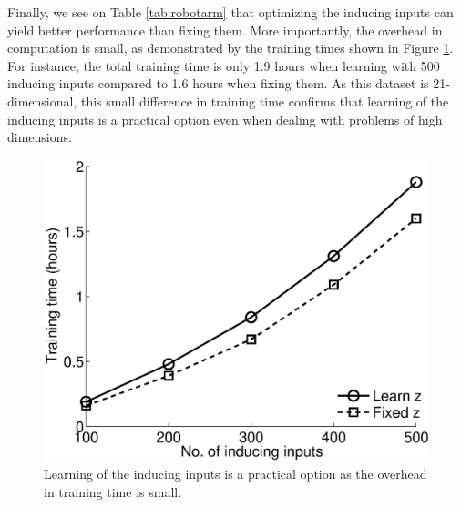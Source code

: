 Finally, we see on Table \ref{tab:robotarm}  that optimizing the inducing inputs can yield better performance than fixing them.
More importantly, the overhead in computation is small, as demonstrated by the training times shown in Figure \ref{fig:time}.
For instance, the total training time is only 1.9 hours when learning with 500 inducing inputs compared to 1.6 hours when fixing them.
As this dataset is 21-dimensional, this small difference in training time confirms that learning of the inducing inputs is a practical option even when dealing with problems of high dimensions.
\begin{figure}
\includegraphics[width=0.7\linewidth]{figures/sarcosTime.eps}
\caption{Learning of the inducing inputs is a practical option as the overhead in training time is small.}
\label{fig:time}
\end{figure}
